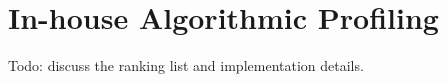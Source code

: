 \section{In-house Algorithmic Profiling}

{\color{red} Todo: discuss the ranking list and implementation details.}